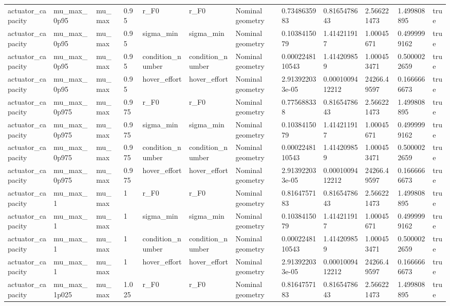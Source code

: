 \begin{tabular}{@{}llllllllllll@{}}
actuator\_capacity & mu\_max\_0p95 & mu\_max & 0.95 & r\_F0 & r\_F0 & Nominal geometry & 0.7348635983 & 0.8165478643 & 2.566221473 & 1.499808895 & true \\
actuator\_capacity & mu\_max\_0p95 & mu\_max & 0.95 & sigma\_min & sigma\_min & Nominal geometry & 0.1038415079 & 1.414211917 & 1.00045671 & 0.4999999162 & true \\
actuator\_capacity & mu\_max\_0p95 & mu\_max & 0.95 & condition\_number & condition\_number & Nominal geometry & 0.0002248110543 & 1.414209859 & 1.000453471 & 0.5000022659 & true \\
actuator\_capacity & mu\_max\_0p95 & mu\_max & 0.95 & hover\_effort & hover\_effort & Nominal geometry & 2.913922033e-05 & 0.0001009412212 & 24266.49597 & 0.1666666673 & true \\
actuator\_capacity & mu\_max\_0p975 & mu\_max & 0.975 & r\_F0 & r\_F0 & Nominal geometry & 0.775688338 & 0.8165478643 & 2.566221473 & 1.499808895 & true \\
actuator\_capacity & mu\_max\_0p975 & mu\_max & 0.975 & sigma\_min & sigma\_min & Nominal geometry & 0.1038415079 & 1.414211917 & 1.00045671 & 0.4999999162 & true \\
actuator\_capacity & mu\_max\_0p975 & mu\_max & 0.975 & condition\_number & condition\_number & Nominal geometry & 0.0002248110543 & 1.414209859 & 1.000453471 & 0.5000022659 & true \\
actuator\_capacity & mu\_max\_0p975 & mu\_max & 0.975 & hover\_effort & hover\_effort & Nominal geometry & 2.913922033e-05 & 0.0001009412212 & 24266.49597 & 0.1666666673 & true \\
actuator\_capacity & mu\_max\_1 & mu\_max & 1 & r\_F0 & r\_F0 & Nominal geometry & 0.8164757183 & 0.8165478643 & 2.566221473 & 1.499808895 & true \\
actuator\_capacity & mu\_max\_1 & mu\_max & 1 & sigma\_min & sigma\_min & Nominal geometry & 0.1038415079 & 1.414211917 & 1.00045671 & 0.4999999162 & true \\
actuator\_capacity & mu\_max\_1 & mu\_max & 1 & condition\_number & condition\_number & Nominal geometry & 0.0002248110543 & 1.414209859 & 1.000453471 & 0.5000022659 & true \\
actuator\_capacity & mu\_max\_1 & mu\_max & 1 & hover\_effort & hover\_effort & Nominal geometry & 2.913922033e-05 & 0.0001009412212 & 24266.49597 & 0.1666666673 & true \\
actuator\_capacity & mu\_max\_1p025 & mu\_max & 1.025 & r\_F0 & r\_F0 & Nominal geometry & 0.8164757183 & 0.8165478643 & 2.566221473 & 1.499808895 & true \\

\end{tabular}
